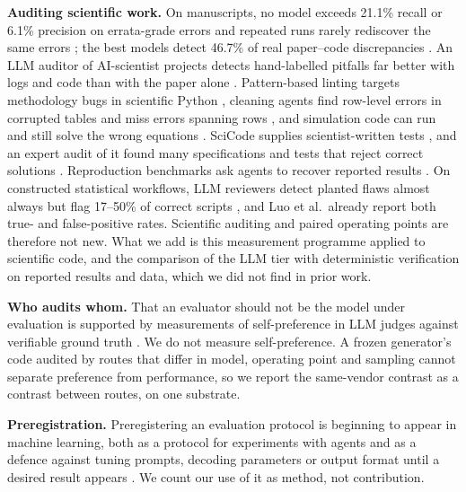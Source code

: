 \textbf{Auditing scientific work.} On manuscripts, no model exceeds 21.1\% recall or 6.1\% precision
on errata-grade errors and repeated runs rarely rediscover the same errors \citep{son2025spot}; the
best models detect 46.7\% of real paper--code discrepancies \citep{baumgartner2026scicoqa}. An LLM
auditor of AI-scientist projects detects hand-labelled pitfalls far better with logs and code than
with the paper alone \citep{luo2025pitfalls}. Pattern-based linting targets methodology bugs in
scientific Python \citep{samsonau2026scicodelint}, cleaning agents find row-level errors in corrupted
tables and miss errors spanning rows \citep{bendinelli2025cleaning}, and simulation code can run and
still solve the wrong equations \citep{song2026moose}. SciCode supplies scientist-written tests
\citep{tian2024scicode}, and an expert audit of it found many specifications and tests that reject
correct solutions \citep{hu2026scicodeverified}. Reproduction benchmarks ask agents to recover
reported results \citep{siegel2024corebench}. On constructed statistical workflows, LLM reviewers
detect planted flaws almost always but flag 17--50\% of correct scripts \citep{chelate2026replicationtrap},
and Luo et al.\ already report both true- and false-positive rates. Scientific auditing and paired
operating points are therefore not new. What we add is this measurement programme applied to
scientific code, and the comparison of the LLM tier with deterministic verification on reported
results and data, which we did not find in prior work.

\textbf{Who audits whom.} That an evaluator should not be the model under evaluation is supported
by measurements of self-preference in LLM judges against verifiable ground truth
\citep{chen2025selfpreference}. We do not measure self-preference. A frozen generator's code
audited by routes that differ in model, operating point and sampling cannot separate preference
from performance, so we report the same-vendor contrast as a contrast between routes, on one
substrate.

\textbf{Preregistration.} Preregistering an evaluation protocol is beginning to appear in machine
learning, both as a protocol for experiments with agents \citep{vaccaro2026prereg} and as a defence
against tuning prompts, decoding parameters or output format until a desired result appears
\citep{thomas2026phacking}. We count our use of it as method, not contribution.
